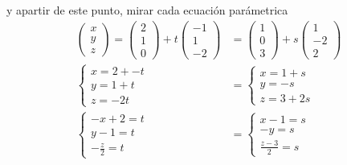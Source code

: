 \documentclass{article}
\begin{document}
\begin{enumerate}
        y apartir de este punto, mirar cada ecuación parámetrica
        \[
            \begin{aligned}
                \begin{pmatrix}
                    x \\ y \\ z
                \end{pmatrix}
                =
                \begin{pmatrix}
                    2 \\ 1 \\ 0
                \end{pmatrix}
                +
                t
                \begin{pmatrix}
                    -1 \\ 1 \\ -2
                \end{pmatrix}
                &=
                \begin{pmatrix}
                    1 \\ 0 \\ 3
                \end{pmatrix}
                +
                s
                \begin{pmatrix}
                    1 \\ -2 \\ 2
                \end{pmatrix} \\
                \begin{cases}
                    x = 2 + -t \\
                    y = 1 + t \\
                    z = -2t
                \end{cases}
                &=
                \begin{cases}
                    x = 1 + s \\
                    y = -s \\
                    z = 3 + 2s
                \end{cases} \\
                \begin{cases}
                    -x + 2 = t \\
                    y - 1 = t \\
                    -\frac{z}{2} = t
                \end{cases}
                &=
                \begin{cases}
                    x - 1 = s \\
                    -y = s \\
                    \frac{z - 3}{2} = s
                \end{cases} \\
            \end{aligned}
        \]


\end{enumerate}
\end{document}
